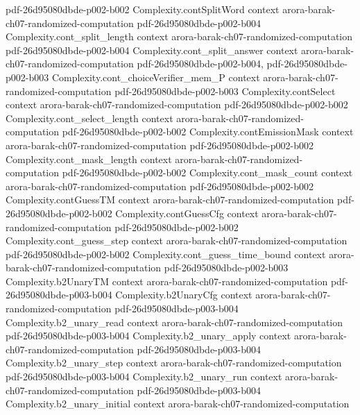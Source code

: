 \begin{theorem}
  {pdf-26d95080dbde-p002-b002}
\proofstep
  {Complexity.contSplitWord}
  {context}
  {arora-barak-ch07-randomized-computation}
  {pdf-26d95080dbde-p002-b004}
\proofstep
  {Complexity.cont_split_length}
  {context}
  {arora-barak-ch07-randomized-computation}
  {pdf-26d95080dbde-p002-b004}
\proofstep
  {Complexity.cont_split_answer}
  {context}
  {arora-barak-ch07-randomized-computation}
  {pdf-26d95080dbde-p002-b004,
    pdf-26d95080dbde-p002-b003}
\proofstep
  {Complexity.cont_choiceVerifier_mem_P}
  {context}
  {arora-barak-ch07-randomized-computation}
  {pdf-26d95080dbde-p002-b003}
\proofstep
  {Complexity.contSelect}
  {context}
  {arora-barak-ch07-randomized-computation}
  {pdf-26d95080dbde-p002-b002}
\proofstep
  {Complexity.cont_select_length}
  {context}
  {arora-barak-ch07-randomized-computation}
  {pdf-26d95080dbde-p002-b002}
\proofstep
  {Complexity.contEmissionMask}
  {context}
  {arora-barak-ch07-randomized-computation}
  {pdf-26d95080dbde-p002-b002}
\proofstep
  {Complexity.cont_mask_length}
  {context}
  {arora-barak-ch07-randomized-computation}
  {pdf-26d95080dbde-p002-b002}
\proofstep
  {Complexity.cont_mask_count}
  {context}
  {arora-barak-ch07-randomized-computation}
  {pdf-26d95080dbde-p002-b002}
\proofstep
  {Complexity.contGuessTM}
  {context}
  {arora-barak-ch07-randomized-computation}
  {pdf-26d95080dbde-p002-b002}
\proofstep
  {Complexity.contGuessCfg}
  {context}
  {arora-barak-ch07-randomized-computation}
  {pdf-26d95080dbde-p002-b002}
\proofstep
  {Complexity.cont_guess_step}
  {context}
  {arora-barak-ch07-randomized-computation}
  {pdf-26d95080dbde-p002-b002}
\proofstep
  {Complexity.cont_guess_time_bound}
  {context}
  {arora-barak-ch07-randomized-computation}
  {pdf-26d95080dbde-p002-b003}
\proofstep
  {Complexity.b2UnaryTM}
  {context}
  {arora-barak-ch07-randomized-computation}
  {pdf-26d95080dbde-p003-b004}
\proofstep
  {Complexity.b2UnaryCfg}
  {context}
  {arora-barak-ch07-randomized-computation}
  {pdf-26d95080dbde-p003-b004}
\proofstep
  {Complexity.b2_unary_read}
  {context}
  {arora-barak-ch07-randomized-computation}
  {pdf-26d95080dbde-p003-b004}
\proofstep
  {Complexity.b2_unary_apply}
  {context}
  {arora-barak-ch07-randomized-computation}
  {pdf-26d95080dbde-p003-b004}
\proofstep
  {Complexity.b2_unary_step}
  {context}
  {arora-barak-ch07-randomized-computation}
  {pdf-26d95080dbde-p003-b004}
\proofstep
  {Complexity.b2_unary_run}
  {context}
  {arora-barak-ch07-randomized-computation}
  {pdf-26d95080dbde-p003-b004}
\proofstep
  {Complexity.b2_unary_initial}
  {context}
  {arora-barak-ch07-randomized-computation}

\end{theorem}
